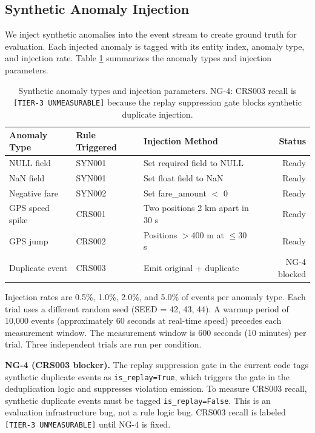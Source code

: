 \subsection{Synthetic Anomaly Injection}

We inject synthetic anomalies into the event stream to create ground truth
for evaluation. Each injected anomaly is tagged with its entity index,
anomaly type, and injection rate. Table \ref{tab:anomaly-types} summarizes
the anomaly types and injection parameters.

\begin{table}[htbp]
  \centering
  \caption{Synthetic anomaly types and injection parameters.
    NG-4: CRS003 recall is \texttt{[TIER-3\ UNMEASURABLE]}
    because the replay suppression gate blocks synthetic duplicate injection.}
  \label{tab:anomaly-types}
  \begin{tabular}{lllr}
    \toprule
    Anomaly Type & Rule Triggered & Injection Method & Status \\
    \midrule
    NULL field         & SYN001 & Set required field to NULL       & Ready \\
    NaN field          & SYN001 & Set float field to NaN          & Ready \\
    Negative fare      & SYN002 & Set fare\_amount $<$ 0           & Ready \\
    GPS speed spike   & CRS001 & Two positions 2 km apart in 30 s & Ready \\
    GPS jump          & CRS002 & Positions $>$400 m at $\leq$30 s & Ready \\
    Duplicate event   & CRS003 & Emit original + duplicate         & NG-4 blocked \\
    \bottomrule
  \end{tabular}
\end{table}

Injection rates are 0.5\%, 1.0\%, 2.0\%, and 5.0\% of events per anomaly type.
Each trial uses a different random seed (SEED = 42, 43, 44). A warmup period
of 10,000 events (approximately 60 seconds at real-time speed) precedes each
measurement window. The measurement window is 600 seconds (10 minutes) per trial.
Three independent trials are run per condition.

\textbf{NG-4 (CRS003 blocker).} The replay suppression gate in the current
code tags synthetic duplicate events as \texttt{is\_replay=True}, which triggers
the gate in the deduplication logic and suppresses violation emission. To measure
CRS003 recall, synthetic duplicate events must be tagged \texttt{is\_replay=False}.
This is an evaluation infrastructure bug, not a rule logic bug. CRS003 recall
is labeled \texttt{[TIER-3\ UNMEASURABLE]} until NG-4 is fixed.

